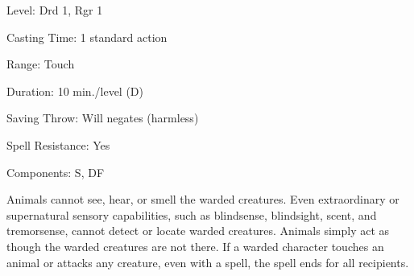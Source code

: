 
\begin{description*}
\item[Level:] Drd 1, Rgr 1
\item[Casting Time:] 1 standard action
\item[Range:] Touch
\item[Duration:] 10 min./level (D)
\item[Saving Throw:] Will negates (harmless)
\item[Spell Resistance:] Yes
\item[Components:] S, DF
\end{description*}

Animals cannot see, hear, or smell the warded creatures. Even extraordinary or
supernatural sensory capabilities, such as blindsense, blindsight, scent, and tremorsense,
cannot detect or locate warded creatures. Animals simply act as though the warded
creatures are not there. If a warded character touches an animal or attacks any
creature, even with a spell, the spell ends for all recipients.